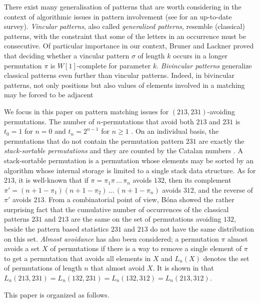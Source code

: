 \documentclass[a4paper]{llncs}
\newcounter{num}
\begin{document}
	There exist many generalisation of patterns that are worth considering
	in the context of algorithmic issues in pattern involvement
	(see \cite{Kitaev:book:2011} for an up-to-date survey).
	\emph{Vincular patterns}, also called 
	\emph{generalized patterns},
	resemble (classical) patterns, with the constraint that some of the letters in
	an occurrence must be consecutive.
	Of particular importance in our context,
	Bruner and Lackner \cite{Bruner:Lackner:SWAT:2012}
	proved that deciding whether a vincular pattern
	$\sigma$ of length $k$ occurs in a longer permutation
	$\pi$ is $W[1]$-complete for
	parameter $k$.
	\emph{Bivincular patterns} generalize classical patterns even further 
	than vincular
	patterns. Indeed, in bivincular patterns,
	not only positions but also values
	of elements involved in a matching may be forced to be adjacent

	We focus in this paper on pattern matching issues for
	$(213,231)$-avoiding permutations.
	The number of $n$-permutations that avoid both 
	$213$ and $231$ is 
	$t_0 = 1$ for $n = 0$ and 
	$t_n =2^{n-1}$ for $n\geq 1$ \cite{Simion:Schmidt:EJC:1985}.
	On an individual basis,
	the permutations that do not contain the permutation pattern $231$
	are exactly the \emph{stack-sortable permutations} and they are counted by 
	the Catalan numbers \cite{Knuth:1997:ACP:260999}.
	A stack-sortable permutation is a permutation whose elements may be sorted by 
	an algorithm whose internal storage is limited to a single stack data structure.
	As for $213$, it is well-known that 
 	if $\pi = \pi_1\pi\,\ldots\,\pi_n$ avoids $132$, then its complement 
 	$\pi' = (n+1-\pi_1)(n+1-\pi_2)\,\ldots\,(n+1-\pi_n)$ avoids $312$, and 
 	the reverse of $\pi'$ avoids $213$.
 	From a combinatorial point of view,
 	B\'ona \cite{Bona:ElJC:2012} 
 	showed the rather surprising fact that the cumulative number of 
 	occurrences of the classical patterns $231$ and $213$ are the same on the 
 	set of permutations avoiding $132$, 
 	beside the pattern based statistics $231$ and $213$ 
 	do not have the same distribution on this set.
 	\emph{Almost avoidance} has also been considered;
 	a permutation $\pi$ almost avoids a set $X$ of permutations 
 	if there is a way to remove a single element of $\pi$ to get a permutation 
 	that avoids all elements in $X$
 	and $L_n(X)$ denotes the set of permutations of length $n$ that almost avoid 
 	$X$.
 	It is shown in \cite{Griffiths:Smith:Warren:PMA:2011} that
 	$L_n(213, 231) = L_n(132, 231) = L_n(132, 312) = L_n(213, 312)$.

	This paper is organized as follows.
	
\end{document}
